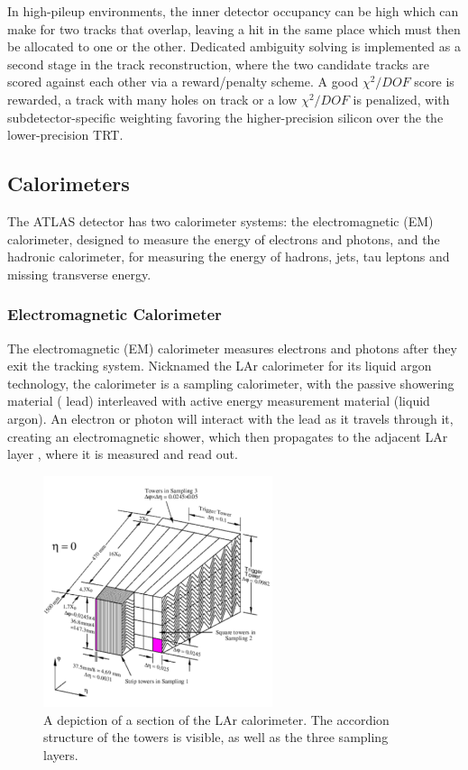 In high-pileup environments, the inner detector occupancy can be high which can make for two tracks that 
overlap, leaving a hit in the same place which must then be allocated to one or the other.  
Dedicated ambiguity solving is implemented as a second stage in the track reconstruction, where the two candidate tracks are 
scored against each other via a reward/penalty scheme.  A good $\chi^2/DOF$ 
score is rewarded, a track with many holes on track or a low $\chi^2/DOF$ 
is penalized, with subdetector-specific weighting favoring the higher-precision silicon over the the lower-precision TRT. 


\subsection{Calorimeters}
The ATLAS detector has two calorimeter systems: the electromagnetic (EM) calorimeter, designed to measure the energy 
of electrons and photons, and the hadronic calorimeter, for measuring the energy of hadrons, jets, tau 
leptons and missing transverse energy.  

\subsubsection{Electromagnetic Calorimeter}
\label{sec:em_cal}

The electromagnetic (EM) calorimeter measures electrons and photons after they exit the tracking system.  Nicknamed the LAr 
calorimeter for its liquid argon technology,  the calorimeter is a sampling calorimeter, with the passive showering material (
lead) interleaved with active energy measurement material (liquid argon).  An electron or photon will interact with the 
lead as it travels through it, creating an electromagnetic shower, which then propagates to the adjacent LAr layer
, where it is measured and read out.


\begin{figure}
\begin{center}
	\includegraphics[width=0.6\textwidth]{ATLASDetector/images/LArg_accordion.pdf}	
	\caption{A depiction of a section of the LAr calorimeter.  The accordion structure of the towers is visible, as well as the three sampling layers. 	\label{fig:lar}}
\end{center}
\end{figure}


